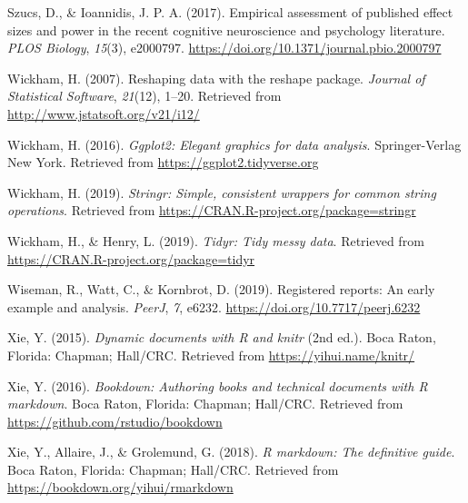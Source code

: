 \documentclass[british,,jou,floatsintext]{apa6}
\begin{document}
\leavevmode\hypertarget{ref-Szucs2017}{}%
Szucs, D., \& Ioannidis, J. P. A. (2017). Empirical assessment of published effect sizes and power in the recent cognitive neuroscience and psychology literature. \emph{PLOS Biology}, \emph{15}(3), e2000797. \url{https://doi.org/10.1371/journal.pbio.2000797}

\leavevmode\hypertarget{ref-R-reshape2}{}%
Wickham, H. (2007). Reshaping data with the reshape package. \emph{Journal of Statistical Software}, \emph{21}(12), 1--20. Retrieved from \url{http://www.jstatsoft.org/v21/i12/}

\leavevmode\hypertarget{ref-R-ggplot2}{}%
Wickham, H. (2016). \emph{Ggplot2: Elegant graphics for data analysis}. Springer-Verlag New York. Retrieved from \url{https://ggplot2.tidyverse.org}

\leavevmode\hypertarget{ref-R-stringr}{}%
Wickham, H. (2019). \emph{Stringr: Simple, consistent wrappers for common string operations}. Retrieved from \url{https://CRAN.R-project.org/package=stringr}

\leavevmode\hypertarget{ref-R-tidyr}{}%
Wickham, H., \& Henry, L. (2019). \emph{Tidyr: Tidy messy data}. Retrieved from \url{https://CRAN.R-project.org/package=tidyr}

\leavevmode\hypertarget{ref-Wiseman2019}{}%
Wiseman, R., Watt, C., \& Kornbrot, D. (2019). Registered reports: An early example and analysis. \emph{PeerJ}, \emph{7}, e6232. \url{https://doi.org/10.7717/peerj.6232}

\leavevmode\hypertarget{ref-R-knitr}{}%
Xie, Y. (2015). \emph{Dynamic documents with R and knitr} (2nd ed.). Boca Raton, Florida: Chapman; Hall/CRC. Retrieved from \url{https://yihui.name/knitr/}

\leavevmode\hypertarget{ref-R-bookdown}{}%
Xie, Y. (2016). \emph{Bookdown: Authoring books and technical documents with R markdown}. Boca Raton, Florida: Chapman; Hall/CRC. Retrieved from \url{https://github.com/rstudio/bookdown}

\leavevmode\hypertarget{ref-R-rmarkdown}{}%
Xie, Y., Allaire, J., \& Grolemund, G. (2018). \emph{R markdown: The definitive guide}. Boca Raton, Florida: Chapman; Hall/CRC. Retrieved from \url{https://bookdown.org/yihui/rmarkdown}
\end{document}
